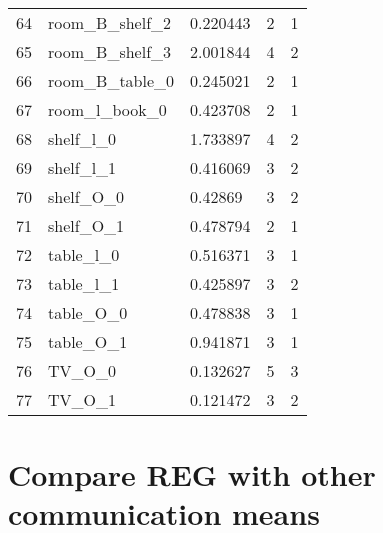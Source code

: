 \begin{longtable}{@{\zz\extracolsep{\fill}} l|llll}
64 & room\_B\_shelf\_2        & 0.220443 & 2 & 1 \\
65 & room\_B\_shelf\_3        & 2.001844 & 4 & 2 \\
66 & room\_B\_table\_0        & 0.245021 & 2 & 1 \\
67 & room\_l\_book\_0         & 0.423708 & 2 & 1 \\
68 & shelf\_l\_0              & 1.733897 & 4 & 2 \\
69 & shelf\_l\_1              & 0.416069 & 3 & 2 \\
70 & shelf\_O\_0              & 0.42869  & 3 & 2 \\
71 & shelf\_O\_1              & 0.478794 & 2 & 1 \\
72 & table\_l\_0              & 0.516371 & 3 & 1 \\
73 & table\_l\_1              & 0.425897 & 3 & 2 \\
74 & table\_O\_0              & 0.478838 & 3 & 1 \\
75 & table\_O\_1              & 0.941871 & 3 & 1 \\
76 & TV\_O\_0                 & 0.132627 & 5 & 3 \\
77 & TV\_O\_1                 & 0.121472 & 3 & 2 \\ \cline{1-4}
\end{longtable}

\section{Compare REG with other communication means}
\label{app:reg_com_plan}


